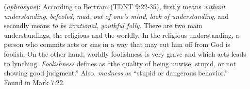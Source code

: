 \item[Foolishness,]

(\textit{aphrosynē}):
According to Bertram (TDNT 9:22-35), firstly  means \emph{without understanding}, \emph{befooled}, \emph{mad}, \emph{out of one's mind}, \emph{lack of understanding}, and secondly  means \emph{to be irrational}, \emph{youthful folly}. There are two main understandings, the religious and the worldly. In the religious understanding, a person who commits acts or sins in a way that may cut him off from God is foolish. On the other hand, worldly foolishness is very grave and which acts leads to lynching. \emph{Foolishness} defines as ``the quality of being unwise, stupid, or not showing good judgment.'' Also, \emph{madness} as ``stupid or dangerous behavior.''
Found in Mark 7:22.

